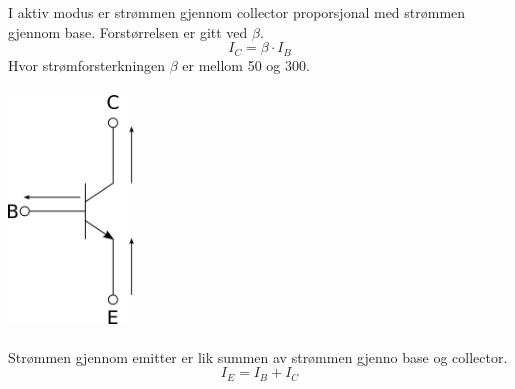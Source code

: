 I aktiv modus er strømmen gjennom collector
proporsjonal med strømmen gjennom base.
Forstørrelsen er gitt ved $\beta$.
$$I_C = \beta \cdot I_B$$
Hvor strømforsterkningen $\beta$ er mellom 50 og 300.
\\\\
\includegraphics[width=0.25\textwidth]{./img/npn-strom}
\\\\
Strømmen gjennom emitter er lik
summen av strømmen gjenno base og collector.
$$I_E = I_B + I_C$$
